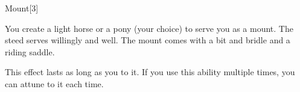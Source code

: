 \begin{spellsection}{Mount}[3]

\begin{spellcontent}

\begin{spelltargetinginfo}




\end{spelltargetinginfo}


\begin{spelleffects}



\spelleffect
You create a light horse or a pony (your choice) to serve you as a mount.
The steed serves willingly and well.
The mount comes with a bit and bridle and a riding saddle.

This effect lasts as long as you  to it.
If you use this ability multiple times, you can attune to it each time.








\end{spelleffects}

\end{spellcontent}
\begin{spellfooter}


\end{spellfooter}
\begin{spellsubcontent}


\end{spellsubcontent}
\end{spellsection}


